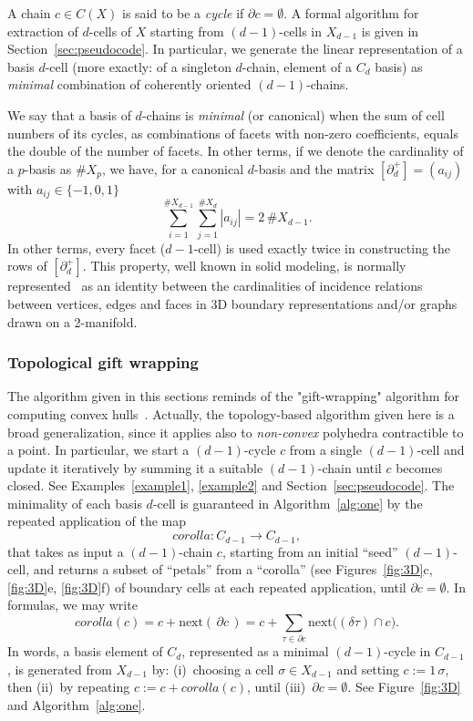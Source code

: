 A chain $c \in C(X)$ is said to be a \emph{cycle} if $\partial c=\emptyset$.
A formal algorithm for extraction of $d$-cells of $X$ starting from
$(d-1)$-cells in $X_{d-1}$ is given in Section~\ref{sec:pseudocode}. In particular, we generate
the linear representation of a basis $d$-cell (more exactly: of a singleton
$d$-chain, element of a $C_d$ basis) as \emph{minimal} combination of coherently oriented 
$(d-1)$-chains.




We say that a basis of $d$-chains is \emph{minimal} (or canonical) when the sum of cell numbers of its cycles, as combinations of facets with non-zero coefficients, equals the double of the number of facets. In other terms, if we denote the cardinality of a $p$-basis as $\# X_p$, we have, for a canonical $d$-basis and the {matrix $[\partial_d^+]=(a_{ij})$} with $a_{ij}\in\{-1,0,1\}$
\[
\sum_{i=1}^{\#X_{d-1}} \sum_{j=1}^{\#X_{d}} |a_{ij}|= 2\,\#X_{d-1}.
\]
{In other terms, every facet ($d-1$-cell) is used exactly twice in constructing the rows of $[\partial_d^+]$.}
This property, well known in solid modeling, is normally represented~\cite{woo:85} as an identity between the cardinalities of incidence relations between vertices, edges and faces in 3D boundary representations and/or graphs drawn on a 2-manifold. 

\subsubsection{Topological gift wrapping}
\label{sec:gift-wrapping}

{The algorithm given in this sections reminds of the "gift-wrapping" algorithm for computing convex hulls~\cite{Jarvis:1973:ICH,Cormen:2009:IAT:1614191}. Actually, the topology-based algorithm given here is a broad generalization, since it applies also to \emph{non-convex} polyhedra contractible to a point.   }
{In particular, we start a $(d-1)$-cycle $c$ from a single $(d-1)$-cell and update it iteratively by summing it a suitable $(d-1)$-chain until $c$ becomes closed. See Examples~\ref{example1}, \ref{example2} and Section~\ref{sec:pseudocode}.}
The minimality of each basis $d$-cell is guaranteed in Algorithm~\ref{alg:one} by the repeated
application of the map \[
\mathit{corolla}: C_{d-1}\to C_{d-1}, 
\] that takes as input a $(d-1)$-chain $c$,
starting from an initial ``seed'' $(d-1)$-cell, and returns a subset of ``petals'' from a ``corolla'' (see Figures~\ref{fig:3D}c, \ref{fig:3D}e, \ref{fig:3D}f) of
boundary cells at each repeated application, until $\partial c = \emptyset$. In formulas, we may write
\[
\mathit{corolla}(c) = c + \mbox{next}(\,\partial c\,) = c + \sum_{\tau\in \partial c} \mbox{next}\big((\delta\tau) \cap c\big).
\]
In words, a basis element of $C_d$, represented as a minimal $(d-1)$-cycle in $C_{d-1}$, is generated from $X_{d-1}$ by: (i)~choosing a
cell $\sigma\in X_{d-1}$ and setting
$c := 1\,\sigma$, then (ii)~by repeating $c := c + \mathit{corolla}(c)$, 
until (iii)~$\partial c = \emptyset$. See Figure~\ref{fig:3D} and Algorithm~\ref{alg:one}.


